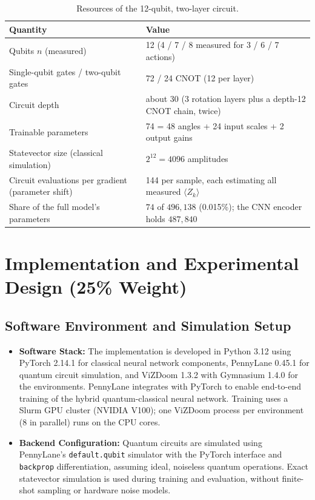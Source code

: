 \documentclass[10pt, a4paper]{article}
\begin{document}
\begin{table}[htbp]
\centering
\footnotesize
\renewcommand{\arraystretch}{1.1}
\caption{Resources of the 12-qubit, two-layer circuit.}
\label{tab:resources}
\begin{tabularx}{\textwidth}{lX}
\toprule
\textbf{Quantity} & \textbf{Value} \\
\midrule
Qubits $n$ (measured) & 12 (4 / 7 / 8 measured for 3 / 6 / 7 actions) \\
Single-qubit gates / two-qubit gates & 72 / 24 CNOT (12 per layer) \\
Circuit depth & about 30 (3 rotation layers plus a depth-12 CNOT chain, twice) \\
Trainable parameters & 74 = 48 angles + 24 input scales + 2 output gains \\
Statevector size (classical simulation) & $2^{12}=4096$ amplitudes \\
Circuit evaluations per gradient (parameter shift) & 144 per sample, each estimating all measured $\langle Z_k\rangle$ \\
Share of the full model's parameters & $74$ of $496{,}138$ (0.015\%); the CNN encoder holds $487{,}840$ \\
\bottomrule
\end{tabularx}
\end{table}

\section{Implementation and Experimental Design (25\% Weight)}
\label{sec:implementation_design}

\subsection{Software Environment and Simulation Setup}
\begin{itemize}
    \item \textbf{Software Stack:}
    The implementation is developed in Python 3.12 using PyTorch 2.14.1 for
    classical neural network components, PennyLane 0.45.1 \cite{bergholm_pennylane_2018} for quantum
    circuit simulation, and ViZDoom 1.3.2 with Gymnasium 1.4.0 for the environments. PennyLane integrates with PyTorch to enable
    end-to-end training of the hybrid quantum-classical neural network. Training uses a Slurm GPU cluster (NVIDIA V100); one ViZDoom process
    per environment (8 in parallel) runs on the CPU cores.

    \item \textbf{Backend Configuration:}
    Quantum circuits are simulated using PennyLane's
    \texttt{default.qubit} simulator with the PyTorch interface and \texttt{backprop} differentiation, assuming ideal,
    noiseless quantum operations. Exact statevector simulation
    is used during training and evaluation, without finite-shot sampling
    or hardware noise models.
\end{itemize}
\end{document}
